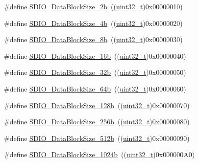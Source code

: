 \begin{DoxyCompactItemize}
\item 
\#define \hyperlink{group___s_d_i_o___data___block___size_ga7209d9d52635b66df85712c6fcd668ea}{S\+D\+I\+O\+\_\+\+Data\+Block\+Size\+\_\+2b}~((\hyperlink{_p_e___types_8h_a33594304e786b158f3fb30289278f5af}{uint32\+\_\+t})0x00000010)
\item 
\#define \hyperlink{group___s_d_i_o___data___block___size_ga59cbaecfdebd63177d1208c268626f0a}{S\+D\+I\+O\+\_\+\+Data\+Block\+Size\+\_\+4b}~((\hyperlink{_p_e___types_8h_a33594304e786b158f3fb30289278f5af}{uint32\+\_\+t})0x00000020)
\item 
\#define \hyperlink{group___s_d_i_o___data___block___size_ga14f91159c8c4faf49a335ed9b6a94d0b}{S\+D\+I\+O\+\_\+\+Data\+Block\+Size\+\_\+8b}~((\hyperlink{_p_e___types_8h_a33594304e786b158f3fb30289278f5af}{uint32\+\_\+t})0x00000030)
\item 
\#define \hyperlink{group___s_d_i_o___data___block___size_ga52a7bdab9a75edd94d9c1152e8b078e2}{S\+D\+I\+O\+\_\+\+Data\+Block\+Size\+\_\+16b}~((\hyperlink{_p_e___types_8h_a33594304e786b158f3fb30289278f5af}{uint32\+\_\+t})0x00000040)
\item 
\#define \hyperlink{group___s_d_i_o___data___block___size_gad0f89aa989c0cedf8d69eb28548413ca}{S\+D\+I\+O\+\_\+\+Data\+Block\+Size\+\_\+32b}~((\hyperlink{_p_e___types_8h_a33594304e786b158f3fb30289278f5af}{uint32\+\_\+t})0x00000050)
\item 
\#define \hyperlink{group___s_d_i_o___data___block___size_ga981c219228ae8df11a501e15843338d4}{S\+D\+I\+O\+\_\+\+Data\+Block\+Size\+\_\+64b}~((\hyperlink{_p_e___types_8h_a33594304e786b158f3fb30289278f5af}{uint32\+\_\+t})0x00000060)
\item 
\#define \hyperlink{group___s_d_i_o___data___block___size_gaba545c3a5e0f3296341d89a647cb9751}{S\+D\+I\+O\+\_\+\+Data\+Block\+Size\+\_\+128b}~((\hyperlink{_p_e___types_8h_a33594304e786b158f3fb30289278f5af}{uint32\+\_\+t})0x00000070)
\item 
\#define \hyperlink{group___s_d_i_o___data___block___size_gaa099d7706f98a4fa6eb88277dc6680cf}{S\+D\+I\+O\+\_\+\+Data\+Block\+Size\+\_\+256b}~((\hyperlink{_p_e___types_8h_a33594304e786b158f3fb30289278f5af}{uint32\+\_\+t})0x00000080)
\item 
\#define \hyperlink{group___s_d_i_o___data___block___size_gaa619848f7700962c5b7065f43e286e0b}{S\+D\+I\+O\+\_\+\+Data\+Block\+Size\+\_\+512b}~((\hyperlink{_p_e___types_8h_a33594304e786b158f3fb30289278f5af}{uint32\+\_\+t})0x00000090)
\item 
\#define \hyperlink{group___s_d_i_o___data___block___size_ga7dad3c1c33e63a00eb6301b0a1135baf}{S\+D\+I\+O\+\_\+\+Data\+Block\+Size\+\_\+1024b}~((\hyperlink{_p_e___types_8h_a33594304e786b158f3fb30289278f5af}{uint32\+\_\+t})0x000000\+A0)

\end{DoxyCompactItemize}
